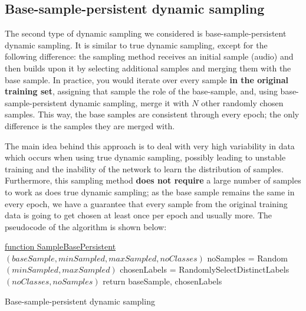 \subsection{Base-sample-persistent dynamic sampling}

The second type of dynamic sampling we considered is base-sample-persistent dynamic sampling. It is similar to true dynamic sampling, except for the following difference: the sampling method receives an initial sample (audio) and then builds upon it by selecting additional samples and merging them with the base sample. In practice, you would iterate over every sample \textbf{in the original training set}, assigning that sample the role of the base-sample, and, using base-sample-persistent dynamic sampling, merge it with $N$ other randomly chosen samples. This way, the base samples are consistent through every epoch; the only difference is the samples they are merged with.

The main idea behind this approach is to deal with very high variability in data which occurs when using true dynamic sampling, possibly leading to unstable training and the inability of the network to learn the distribution of samples. Furthermore, this sampling method \textbf{does not require} a large number of samples to work as does true dynamic sampling; as the base sample remains the same in every epoch, we have a guarantee that every sample from the original training data is going to get chosen at least once per epoch and usually more. The pseudocode of the algorithm is shown below: 

\begin{algorithm}[H]

    \underline{function SampleBasePersistent} $(baseSample, minSampled, maxSampled, noClasses)$\;
    noSamples = Random$(minSampled, maxSampled)$\;
    chosenLabels = RandomlySelectDistinctLabels$(noClasses, noSamples)$\;
    return baseSample, chosenLabels \;
    \caption{Base-sample-persistent dynamic sampling}
\end{algorithm}

